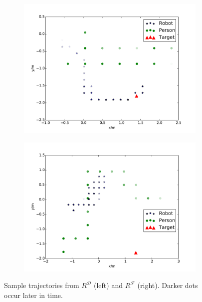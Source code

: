 \documentclass[letterpaper]{article}
\begin{document}
\begin{figure}[t]
\vspace{-2mm}
  \hspace{-10pt}
  \begin{subfigure}{0.22\textwidth}
    \includegraphics[scale = 0.22]{images/gp.pdf}
    \label{fig:good_path}
  \end{subfigure}
  \hspace{10pt}
  \begin{subfigure}{0.22\textwidth}
    \includegraphics[scale = 0.22]{images/bp.pdf}
    \label{fig:bad_path}
\end{subfigure}
\vspace{-4mm}
  \caption{Sample trajectories from $R^\mathcal{D}$ (left) and $R^\mathcal{F}$ (right). Darker dots occur later in time.} %
  \label{fig:paths}
\vspace{-4mm}
\end{figure}
\end{document}
